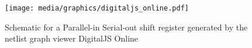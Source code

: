 
\begin{figure}[t]
    \centering
    \texttt{[image: media/graphics/digitaljs\_online.pdf]}
    \caption[
        DigitalJS Online Example
    ]{
        Schematic for a Parallel-in Serial-out shift register generated by the netlist graph viewer DigitalJS Online \cite{DigitalJSOnline}
    }
    \label{fig:digitaljs_online}
\end{figure}
